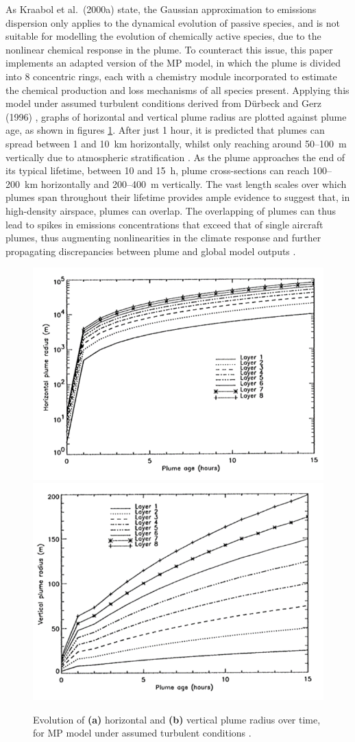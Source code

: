 As Kraabol et al.\ (2000a) \cite{Kraabol2000a} state, the Gaussian approximation to emissions dispersion only applies to the dynamical evolution of passive species, and is not suitable for modelling the evolution of chemically active species, due to the nonlinear chemical response in the plume. To counteract this issue, this paper implements an adapted version of the MP model, in which the plume is divided into 8 concentric rings, each with a chemistry module incorporated to estimate the chemical production and loss mechanisms of all species present. Applying this model under assumed turbulent conditions derived from D{\"u}rbeck and Gerz (1996) \cite{Durbeck1996}, graphs of horizontal and vertical plume radius are plotted against plume age, as shown in figures \ref{Kraabol}. After just 1 hour, it is predicted that plumes can spread between 1 and 10~km horizontally, whilst only reaching around 50--100~m vertically due to atmospheric stratification \cite{Durbeck1995}. As the plume approaches the end of its typical lifetime, between 10 and 15~h, plume cross-sections can reach 100--200~km horizontally and 200--400~m vertically. The vast length scales over which plumes span throughout their lifetime provides ample evidence to suggest that, in high-density airspace, plumes can overlap. The overlapping of plumes can thus lead to spikes in emissions concentrations that exceed that of single aircraft plumes, thus augmenting nonlinearities in the climate response and further propagating discrepancies between plume and global model outputs \cite{Schlager1997}. 


\begin{figure}[H]
	\centering
	\subfloat
		{
\centering
		\includegraphics[width=.36\textwidth]{Kraabol1.png}
		}
	\subfloat
		{
\centering
		\includegraphics[width=.36\textwidth]{Kraabol2.png}
		}
	\caption{Evolution of \textbf{(a)} horizontal and \textbf{(b)} vertical plume radius over time, for MP model under assumed turbulent conditions \cite{Kraabol2000}.}
	\label{Kraabol}
\end{figure}

